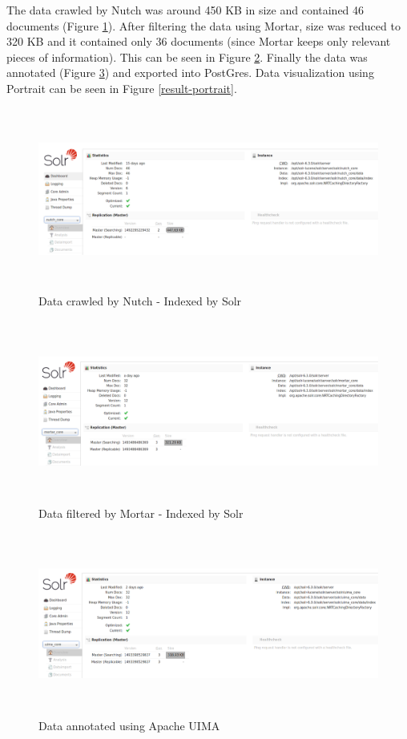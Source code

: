 The data crawled by Nutch was around 450 KB in size and contained 46
documents (Figure \ref{result-nutch-core}). After
filtering the data using Mortar, size was reduced to 320 KB and it
contained only 36 documents (since Mortar keeps only relevant pieces
of information). This can be seen in Figure \ref{result-mortar-core}. 
Finally the data was annotated (Figure \ref{result-uima-core}) and
exported into PostGres. Data visualization using Portrait can be seen
in Figure \ref{result-portrait}. 

\begin{figure}
  \centering
  \includegraphics[width=15cm,height=6cm]{screenshots/result-nutch-core.png}
  \caption{Data crawled by Nutch - Indexed by Solr}
  \label{result-nutch-core}
\end{figure}

\begin{figure}
  \centering
  \includegraphics[width=15cm,height=6cm]{screenshots/result-mortar-core.png}
  \caption{Data filtered by Mortar - Indexed by Solr}
  \label{result-mortar-core}
\end{figure}

\begin{figure}
  \centering
  \includegraphics[width=15cm,height=6cm]{screenshots/result-uima-core.png}
  \caption{Data annotated using Apache UIMA}
  \label{result-uima-core}
\end{figure}

